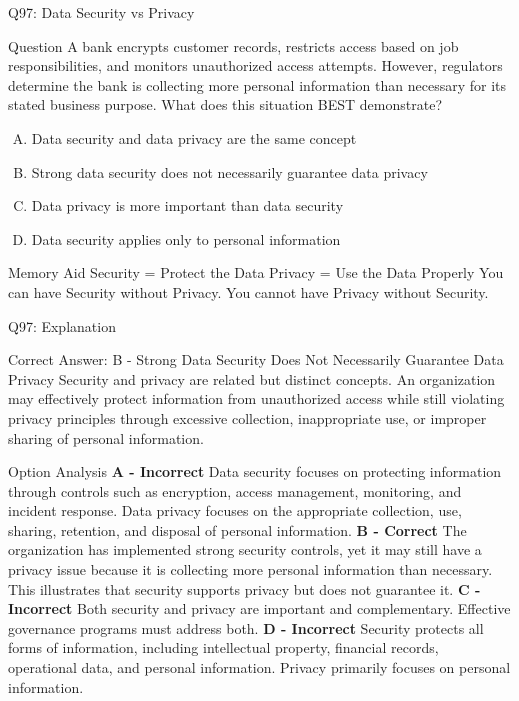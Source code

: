 \documentclass{beamer}
\begin{document}
	
	\begin{frame}{Q97: Data Security vs Privacy} \begin{block}{Question} A bank encrypts customer records, restricts access based on job responsibilities, and monitors unauthorized access attempts. However, regulators determine the bank is collecting more personal information than necessary for its stated business purpose. What does this situation BEST demonstrate? \end{block} \begin{enumerate}[(A)] \item Data security and data privacy are the same concept \item Strong data security does not necessarily guarantee data privacy \item Data privacy is more important than data security \item Data security applies only to personal information \end{enumerate} 
	\begin{block}{Memory Aid} Security = Protect the Data Privacy = Use the Data Properly You can have Security without Privacy. You cannot have Privacy without Security. \end{block} 
	\end{frame} \begin{frame}{Q97: Explanation} \footnotesize \begin{block}{Correct Answer: B - Strong Data Security Does Not Necessarily Guarantee Data Privacy} Security and privacy are related but distinct concepts. An organization may effectively protect information from unauthorized access while still violating privacy principles through excessive collection, inappropriate use, or improper sharing of personal information. \end{block} \begin{block}{Option Analysis} \textbf{A - Incorrect} Data security focuses on protecting information through controls such as encryption, access management, monitoring, and incident response. Data privacy focuses on the appropriate collection, use, sharing, retention, and disposal of personal information. \vspace{0.15cm} \textbf{B - Correct} The organization has implemented strong security controls, yet it may still have a privacy issue because it is collecting more personal information than necessary. This illustrates that security supports privacy but does not guarantee it. \vspace{0.15cm} \textbf{C - Incorrect} Both security and privacy are important and complementary. Effective governance programs must address both. \vspace{0.15cm} \textbf{D - Incorrect} Security protects all forms of information, including intellectual property, financial records, operational data, and personal information. Privacy primarily focuses on personal information. \end{block} \end{frame}
	
\end{document}
